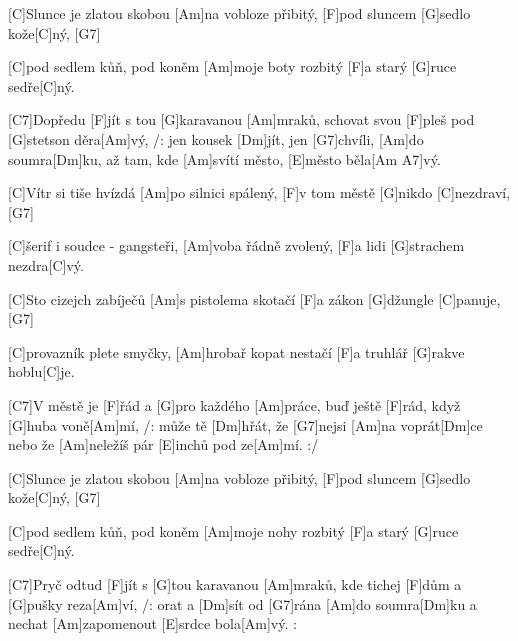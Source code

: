 
[C]Slunce je zlatou skobou [Am]na vobloze přibitý, 
[F]pod sluncem [G]sedlo kože[C]ný, [G7]

[C]pod sedlem kůň, pod koněm [Am]moje boty rozbitý
[F]a starý [G]ruce sedře[C]ný.

[C7]Dopředu [F]jít s tou [G]karavanou [Am]mraků,
schovat svou [F]pleš pod [G]stetson děra[Am]vý,
/: jen kousek [Dm]jít, jen [G7]chvíli, [Am]do soumra[Dm]ku,
až tam, kde [Am]svítí město, [E]město běla[Am A7]vý.

[C]Vítr si tiše hvízdá [Am]po silnici spálený,
[F]v tom městě [G]nikdo [C]nezdraví, [G7]

[C]\null šerif i soudce - gangsteři, [Am]voba řádně zvolený,
[F]a lidi [G]strachem nezdra[C]vý.

[C]Sto cizejch zabíječů [Am]s pistolema skotačí
[F]a zákon [G]džungle [C]panuje, [G7]

[C]provazník plete smyčky, [Am]hrobař kopat nestačí
[F]a truhlář [G]rakve hoblu[C]je.

[C7]V městě je [F]\null řád a [G]pro každého [Am]práce,
buď ještě [F]rád, když [G]huba voně[Am]mí,
/: může tě [Dm]hřát, že [G7]nejsi [Am]na voprát[Dm]ce
nebo že [Am]neležíš pár [E]inchů pod ze[Am]mí. :/

[C]Slunce je zlatou skobou [Am]na vobloze přibitý,
[F]pod sluncem [G]sedlo kože[C]ný, [G7]

[C]pod sedlem kůň, pod koněm [Am]moje nohy rozbitý
[F]a starý [G]ruce sedře[C]ný.

[C7]Pryč odtud [F]jít s [G]tou karavanou [Am]mraků,
kde tichej [F]dům a [G]pušky reza[Am]ví,
/: orat a [Dm]sít od [G7]rána [Am]do soumra[Dm]ku
a nechat [Am]zapomenout [E]srdce bola[Am]vý. :

